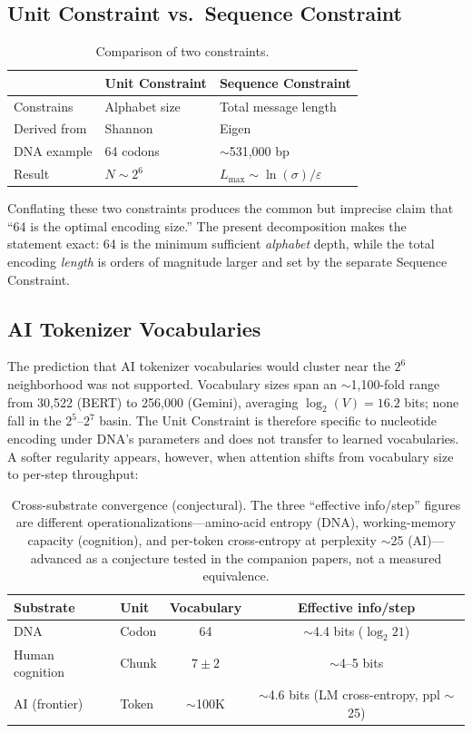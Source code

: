 \documentclass[11pt]{article}
\begin{document}
\subsection{Unit Constraint vs.\ Sequence Constraint}

\begin{table}[ht]
\centering
\caption{Comparison of two constraints.}
\label{tab:constraints}
\begin{tabular}{lll}
\toprule
 & Unit Constraint & Sequence Constraint \\
\midrule
Constrains & Alphabet size & Total message length \\
Derived from & Shannon & Eigen~\cite{eigen1971} \\
DNA example & 64 codons & $\sim$531,000 bp \\
Result & $N \sim 2^6$ & $L_{\max} \sim \ln(\sigma)/\varepsilon$ \\
\bottomrule
\end{tabular}
\end{table}

Conflating these two constraints produces the common but imprecise claim that ``64 is the optimal encoding size.'' The present decomposition makes the statement exact: 64 is the minimum sufficient \emph{alphabet} depth, while the total encoding \emph{length} is orders of magnitude larger and set by the separate Sequence Constraint.

\subsection{AI Tokenizer Vocabularies}

The prediction that AI tokenizer vocabularies would cluster near the $2^6$ neighborhood was not supported. Vocabulary sizes span an $\sim$1{,}100-fold range from 30{,}522 (BERT) to 256{,}000 (Gemini), averaging $\log_2(V) = 16.2$ bits; none fall in the $2^5$--$2^7$ basin. The Unit Constraint is therefore specific to nucleotide encoding under DNA's parameters and does not transfer to learned vocabularies. A softer regularity appears, however, when attention shifts from vocabulary size to per-step throughput:

\begin{table}[ht]
\centering
\caption{Cross-substrate convergence (conjectural). The three ``effective info/step'' figures are different operationalizations---amino-acid entropy (DNA), working-memory capacity (cognition), and per-token cross-entropy at perplexity $\sim$25 (AI)---advanced as a conjecture tested in the companion papers, not a measured equivalence.}
\label{tab:crosssubstrate}
\begin{tabular}{llcc}
\toprule
Substrate & Unit & Vocabulary & Effective info/step \\
\midrule
DNA & Codon & 64 & $\sim$4.4 bits ($\log_2 21$) \\
Human cognition & Chunk & $7 \pm 2$ & $\sim$4--5 bits \\
AI (frontier) & Token & $\sim$100K & $\sim$4.6 bits (LM cross-entropy, ppl $\sim$25) \\
\bottomrule
\end{tabular}
\end{table}
\end{document}
